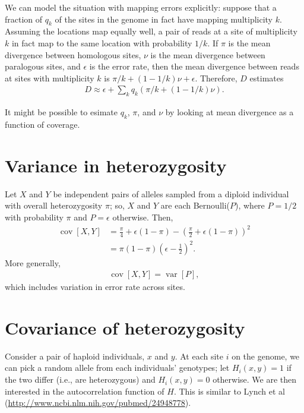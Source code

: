 \documentclass{article}
\DeclareMathOperator{\var}{var}
\DeclareMathOperator{\cov}{cov}
\begin{document}
We can model the situation with mapping errors explicitly:
suppose that a fraction of $q_k$ of the sites in the genome
in fact have mapping multiplicity $k$.
Assuming the locations map equally well,
a pair of reads at a site of multiplicity $k$ 
in fact map to the same location with probability $1/k$.
If $\pi$ is the mean divergence between homologous sites,
$\nu$ is the mean divergence between paralogous sites,
and $\epsilon$ is the error rate,
then the mean divergence between reads at sites with multiplicity $k$ 
is $\pi/k + (1-1/k) \nu + \epsilon$.
Therefore, $D$ estimates
\begin{align}
  D \approx \epsilon + \sum_k q_k \left( \pi/k + (1-1/k) \nu \right) .
\end{align}

It might be possible to esimate $q_k$, $\pi$, and $\nu$ by looking at mean divergence as a function of coverage.


\section*{Variance in heterozygosity}

Let $X$ and $Y$ be independent pairs of alleles sampled from a diploid individual
with overall heterozygosity $\pi$;
so, $X$ and $Y$ are each Bernoulli($P$), where $P=1/2$ with probability $\pi$
and $P=\epsilon$ otherwise.
Then,
\begin{align}
    \cov[X,Y] &= \frac{\pi}{4} + \epsilon(1-\pi) - \left( \frac{\pi}{2} + \epsilon(1-\pi) \right)^2 \\
        &= \pi (1-\pi) \left(\epsilon-\frac{1}{2}\right)^2 .
\end{align}
More generally,
\begin{align}
    \cov[X,Y] = \var[P] ,
\end{align}
which includes variation in error rate across sites.


\section*{Covariance of heterozygosity}

Consider a pair of haploid individuals, $x$ and $y$.
At each site $i$ on the genome, we can pick a random allele from each individuals' genotypes;
let $H_i(x,y)=1$ if the two differ (i.e., are heterozygous) and $H_i(x,y)=0$ otherwise.
We are then interested in the autocorrelation function of $H$.
This is similar to Lynch et al (\url{http://www.ncbi.nlm.nih.gov/pubmed/24948778}).
\end{document}
